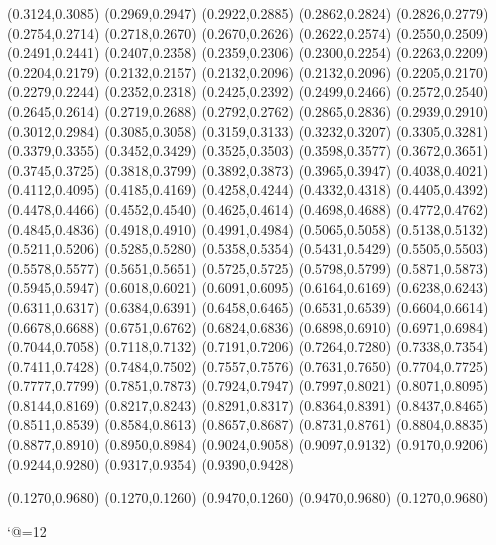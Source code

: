 \PST@Diamond(0.3124,0.3085)
\PST@Diamond(0.2969,0.2947)
\PST@Diamond(0.2922,0.2885)
\PST@Diamond(0.2862,0.2824)
\PST@Diamond(0.2826,0.2779)
\PST@Diamond(0.2754,0.2714)
\PST@Diamond(0.2718,0.2670)
\PST@Diamond(0.2670,0.2626)
\PST@Diamond(0.2622,0.2574)
\PST@Diamond(0.2550,0.2509)
\PST@Diamond(0.2491,0.2441)
\PST@Diamond(0.2407,0.2358)
\PST@Diamond(0.2359,0.2306)
\PST@Diamond(0.2300,0.2254)
\PST@Diamond(0.2263,0.2209)
\PST@Diamond(0.2204,0.2179)
\PST@Diamond(0.2132,0.2157)
\PST@Dashed(0.2132,0.2096)
(0.2132,0.2096)
(0.2205,0.2170)
(0.2279,0.2244)
(0.2352,0.2318)
(0.2425,0.2392)
(0.2499,0.2466)
(0.2572,0.2540)
(0.2645,0.2614)
(0.2719,0.2688)
(0.2792,0.2762)
(0.2865,0.2836)
(0.2939,0.2910)
(0.3012,0.2984)
(0.3085,0.3058)
(0.3159,0.3133)
(0.3232,0.3207)
(0.3305,0.3281)
(0.3379,0.3355)
(0.3452,0.3429)
(0.3525,0.3503)
(0.3598,0.3577)
(0.3672,0.3651)
(0.3745,0.3725)
(0.3818,0.3799)
(0.3892,0.3873)
(0.3965,0.3947)
(0.4038,0.4021)
(0.4112,0.4095)
(0.4185,0.4169)
(0.4258,0.4244)
(0.4332,0.4318)
(0.4405,0.4392)
(0.4478,0.4466)
(0.4552,0.4540)
(0.4625,0.4614)
(0.4698,0.4688)
(0.4772,0.4762)
(0.4845,0.4836)
(0.4918,0.4910)
(0.4991,0.4984)
(0.5065,0.5058)
(0.5138,0.5132)
(0.5211,0.5206)
(0.5285,0.5280)
(0.5358,0.5354)
(0.5431,0.5429)
(0.5505,0.5503)
(0.5578,0.5577)
(0.5651,0.5651)
(0.5725,0.5725)
(0.5798,0.5799)
(0.5871,0.5873)
(0.5945,0.5947)
(0.6018,0.6021)
(0.6091,0.6095)
(0.6164,0.6169)
(0.6238,0.6243)
(0.6311,0.6317)
(0.6384,0.6391)
(0.6458,0.6465)
(0.6531,0.6539)
(0.6604,0.6614)
(0.6678,0.6688)
(0.6751,0.6762)
(0.6824,0.6836)
(0.6898,0.6910)
(0.6971,0.6984)
(0.7044,0.7058)
(0.7118,0.7132)
(0.7191,0.7206)
(0.7264,0.7280)
(0.7338,0.7354)
(0.7411,0.7428)
(0.7484,0.7502)
(0.7557,0.7576)
(0.7631,0.7650)
(0.7704,0.7725)
(0.7777,0.7799)
(0.7851,0.7873)
(0.7924,0.7947)
(0.7997,0.8021)
(0.8071,0.8095)
(0.8144,0.8169)
(0.8217,0.8243)
(0.8291,0.8317)
(0.8364,0.8391)
(0.8437,0.8465)
(0.8511,0.8539)
(0.8584,0.8613)
(0.8657,0.8687)
(0.8731,0.8761)
(0.8804,0.8835)
(0.8877,0.8910)
(0.8950,0.8984)
(0.9024,0.9058)
(0.9097,0.9132)
(0.9170,0.9206)
(0.9244,0.9280)
(0.9317,0.9354)
(0.9390,0.9428)

\PST@Border(0.1270,0.9680)
(0.1270,0.1260)
(0.9470,0.1260)
(0.9470,0.9680)
(0.1270,0.9680)

\catcode`@=12
\fi
\endpspicture
